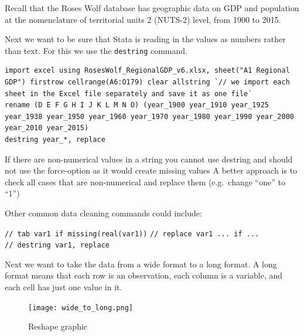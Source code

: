 \documentclass[
  letterpaper,
  DIV=11,
  numbers=noendperiod]{scrartcl}
\begin{document}
\begin{tcolorbox}[enhanced jigsaw, breakable, arc=.35mm, coltitle=black, opacitybacktitle=0.6, colframe=quarto-callout-tip-color-frame, rightrule=.15mm, colbacktitle=quarto-callout-tip-color!10!white, toprule=.15mm, colback=white, toptitle=1mm, bottomtitle=1mm, titlerule=0mm, opacityback=0, left=2mm, leftrule=.75mm, title=\textcolor{quarto-callout-tip-color}{\faLightbulb}\hspace{0.5em}{Tip}, bottomrule=.15mm]

Recall that the Roses Wolf database has geographic data on GDP and
population at the nomenclature of territorial units 2 (NUTS-2) level,
from 1900 to 2015.

\end{tcolorbox}

Next we want to be sure that Stata is reading in the values as numbers
rather than text. For this we use the \texttt{destring} command.

\begin{verbatim}
import excel using RosesWolf_RegionalGDP_v6.xlsx, sheet("A1 Regional GDP") firstrow cellrange(A6:O179) clear allstring `// we import each sheet in the Excel file separately and save it as one file`
rename (D E F G H I J K L M N O) (year_1900 year_1910 year_1925 year_1938 year_1950 year_1960 year_1970 year_1980 year_1990 year_2000 year_2010 year_2015)
destring year_*, replace
\end{verbatim}

If there are non-numerical values in a string you cannot use destring
and should not use the force-option as it would create missing values A
better approach is to check all cases that are non-numerical and replace
them (e.g.~change ``one'' to ``1'')

Other common data cleaning commands could include:

\texttt{//\ tab\ var1\ if\ missing(real(var1))}
\texttt{//\ replace\ var1\ ...\ if\ ...}
\texttt{//\ destring\ var1,\ replace}

Next we want to take the data from a wide format to a long format. A
long format means that each row is an observation, each column is a
variable, and each cell has just one value in it.

\begin{figure}

{\centering \texttt{[image: wide\_to\_long.png]}

}

\caption{Reshape graphic}

\end{figure}
\end{document}
